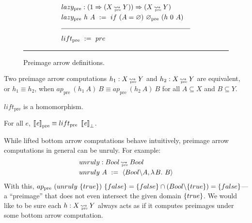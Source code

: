 \documentclass{llncs}
\newcommand{\arrow}{\rightsquigarrow}
\newcommand{\arrowlift}{\ensuremath{lift}}
\newcommand{\arrowlazy}{\ensuremath{lazy}}
\newcommand{\pre}{_\mathrm{pre}}
\DeclareMathOperator{\preto}{\arrow_{\mspace{-19mu}\pre}}
\newcommand{\liftpre}{\arrowlift\pre}
\newcommand{\lazypre}{\arrowlazy\pre}
\begin{document}
\begin{figure*}[t]
\begin{align*}
\begin{aligned}[t]
\\[-6pt]
	&\begin{aligned}[t]
		&\lazypre : (1 \tto (X \preto Y)) \tto (X \preto Y) \\
		&\lazypre~h~A \ := \ if~(A = \emptyset)~\emptyset\pre~(h~0~A)
	\end{aligned} \\
\\[-6pt]
\hline
\\[-6pt]
	&\begin{aligned}[t]
		&\liftpre \ := \ pre
	\end{aligned}
\end{aligned}
\end{align*}
\hrule
\caption[ ]{Preimage arrow definitions.}
\label{fig:preimage-arrow-defs}
\end{figure*}

\begin{definition}
Two preimage arrow computations $h_1 : X \preto Y$ and $h_2 : X \preto Y$ are equivalent, or $h_1 \equiv h_2$, when 
$ap\pre~(h_1~A)~B \equiv ap\pre~(h_2~A)~B$ for all $A \subseteq X$ and $B \subseteq Y$.
\end{definition}

\begin{theorem}
$\liftpre$ is a homomorphism.
\end{theorem}

\begin{corollary}
\label{cor:preimage-arrow-correctness}
For all $\mathit{e}$, $\meaningof{\mathit{e}}\pre \equiv \liftpre~\meaningof{\mathit{e}}_\bot$.
\end{corollary}

While lifted bottom arrow computations behave intuitively, preimage arrow computations in general can be unruly.
For example:
\begin{equation}
\begin{aligned}
	&unruly : Bool \preto Bool \\
	&unruly~A \ := \ \pair{Bool \w A, \fun{B} B}
\end{aligned}
\end{equation}
With this, $ap\pre~(unruly~\set{true})~\set{false} = \set{false} \i (Bool \w \set{true}) = \set{false}$---a ``preimage'' that does not even intersect the given domain $\{{true}\}$.
We would like to be sure each $h : X \preto Y$ always acts as if it computes preimages under some bottom arrow computation.
\end{document}
